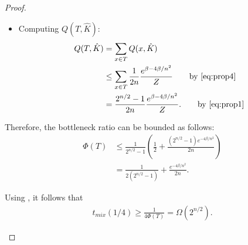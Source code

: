 \begin{proof}
\begin{itemize}
  \item Computing $Q(T, \hat{K})$:
    \begin{align*}
      Q(T, \hat{K}) &= \sum_{x \in T} Q(x, \hat{K}) \\
                    &\leq \sum_{x \in T} \frac{1}{2n} \frac{e^{\beta - 4\beta/n^2}}{Z} \tag*{by \eqref{eq:prop4}} \\
                    &= \frac{2^{n/2} - 1}{2n} \frac{e^{\beta - 4\beta/n^2}}{Z}. \tag*{by \eqref{eq:prop1}}
    \end{align*}
\end{itemize}

Therefore, the bottleneck ratio can be bounded as follows:
\begin{align*}
  \Phi(T) &\leq \frac{1}{2^{n/2} - 1}\left(\frac{1}{2} + \frac{(2^{n/2} - 1) e^{-4\beta/n^2}}{2n}\right)\\
          &= \frac{1}{2(2^{n/2} - 1)} + \frac{e^{-4\beta/n^2}}{2n}.
\end{align*}

Using \citep[Theorem 7.3]{levin08book}, it follows that
\begin{align*}
  t_{mix}(1/4) \geq \frac{1}{4\Phi(T)} = \Omega(2^{n/2}).
\end{align*}

\newcommand{\subflen}{0.49\textwidth}
\newcommand{\scspacey}{0em}
\newcommand{\scspacex}{0em}
\begin{figure}[tb]
  \begin{subfigure}[b]{\subflen}
	\centering
\end{subfigure}
\end{figure}
\end{proof}

